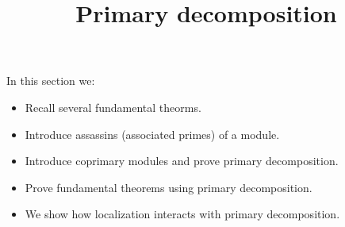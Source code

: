 \documentclass{ximera}
\title{Primary decomposition}
\begin{document}
\begin{abstract}
\end{abstract}

\maketitle

In this section we:

\begin{itemize}
\item Recall several fundamental theorms.
\item Introduce assassins (associated primes) of a module.
\item Introduce coprimary modules and prove primary decomposition.
\item Prove fundamental theorems using primary decomposition.
\item We show how localization interacts with primary decomposition.
\end{itemize}
\end{document}
